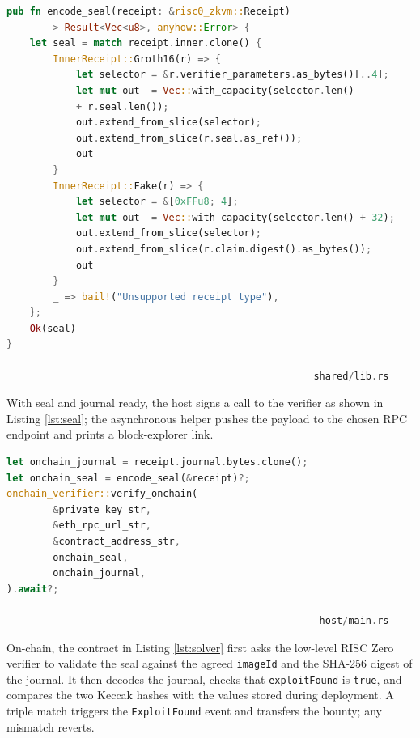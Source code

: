 \begin{lstlisting}[caption={[encode\_seal()]},label={lst:encodeseal},language=Rust]
pub fn encode_seal(receipt: &risc0_zkvm::Receipt) 
       -> Result<Vec<u8>, anyhow::Error> {
    let seal = match receipt.inner.clone() {
        InnerReceipt::Groth16(r) => {
            let selector = &r.verifier_parameters.as_bytes()[..4];
            let mut out  = Vec::with_capacity(selector.len() 
            + r.seal.len());
            out.extend_from_slice(selector);
            out.extend_from_slice(r.seal.as_ref());
            out
        }
        InnerReceipt::Fake(r) => {
            let selector = &[0xFFu8; 4];
            let mut out  = Vec::with_capacity(selector.len() + 32);
            out.extend_from_slice(selector);
            out.extend_from_slice(r.claim.digest().as_bytes());
            out
        }
        _ => bail!("Unsupported receipt type"),
    };
    Ok(seal)
}

                                                     shared/lib.rs
\end{lstlisting}

With seal and journal ready, the host signs a call to the verifier as shown in Listing \ref{lst:seal}; the asynchronous helper pushes the payload to the chosen RPC endpoint and prints a block-explorer link.

\begin{lstlisting}[caption={[Preparing on-chain calldata]},label={lst:seal},language=Rust]
let onchain_journal = receipt.journal.bytes.clone();
let onchain_seal = encode_seal(&receipt)?;
onchain_verifier::verify_onchain(
        &private_key_str,
        &eth_rpc_url_str,
        &contract_address_str,
        onchain_seal,
        onchain_journal,
).await?;

                                                      host/main.rs
\end{lstlisting}

On-chain, the contract in Listing \ref{lst:solver} first asks the low-level RISC Zero verifier to validate the seal against the agreed \texttt{imageId} and the SHA-256 digest of the journal.  It then decodes the journal, checks that \texttt{exploitFound} is \texttt{true}, and compares the two Keccak hashes with the values stored during deployment.  A triple match triggers the \texttt{ExploitFound} event and transfers the bounty; any mismatch reverts.

